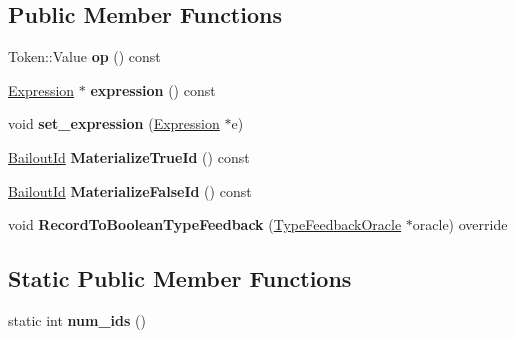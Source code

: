 \subsection*{Public Member Functions}
\begin{DoxyCompactItemize}
\item 
Token\+::\+Value {\bfseries op} () const \hypertarget{classv8_1_1internal_1_1_unary_operation_aa7ba61d263e7c3c37909031230894c5e}{}\label{classv8_1_1internal_1_1_unary_operation_aa7ba61d263e7c3c37909031230894c5e}

\item 
\hyperlink{classv8_1_1internal_1_1_expression}{Expression} $\ast$ {\bfseries expression} () const \hypertarget{classv8_1_1internal_1_1_unary_operation_a1c4b19c5a33bddaaa5cdaef84b027350}{}\label{classv8_1_1internal_1_1_unary_operation_a1c4b19c5a33bddaaa5cdaef84b027350}

\item 
void {\bfseries set\+\_\+expression} (\hyperlink{classv8_1_1internal_1_1_expression}{Expression} $\ast$e)\hypertarget{classv8_1_1internal_1_1_unary_operation_a7ce81074ce9790e356e4253abe3890af}{}\label{classv8_1_1internal_1_1_unary_operation_a7ce81074ce9790e356e4253abe3890af}

\item 
\hyperlink{classv8_1_1internal_1_1_bailout_id}{Bailout\+Id} {\bfseries Materialize\+True\+Id} () const \hypertarget{classv8_1_1internal_1_1_unary_operation_a056b0bdffff27333b08d29351ed4cd54}{}\label{classv8_1_1internal_1_1_unary_operation_a056b0bdffff27333b08d29351ed4cd54}

\item 
\hyperlink{classv8_1_1internal_1_1_bailout_id}{Bailout\+Id} {\bfseries Materialize\+False\+Id} () const \hypertarget{classv8_1_1internal_1_1_unary_operation_ae557f28b5bf97b18ed73f92fe9343db1}{}\label{classv8_1_1internal_1_1_unary_operation_ae557f28b5bf97b18ed73f92fe9343db1}

\item 
void {\bfseries Record\+To\+Boolean\+Type\+Feedback} (\hyperlink{classv8_1_1internal_1_1_type_feedback_oracle}{Type\+Feedback\+Oracle} $\ast$oracle) override\hypertarget{classv8_1_1internal_1_1_unary_operation_aaef1f9493dc092edb7a18cf90c01de54}{}\label{classv8_1_1internal_1_1_unary_operation_aaef1f9493dc092edb7a18cf90c01de54}

\end{DoxyCompactItemize}
\subsection*{Static Public Member Functions}
\begin{DoxyCompactItemize}
\item 
static int {\bfseries num\+\_\+ids} ()\hypertarget{classv8_1_1internal_1_1_unary_operation_abbaf08e7c9ee0f748aa62218cdb2bdf7}{}\label{classv8_1_1internal_1_1_unary_operation_abbaf08e7c9ee0f748aa62218cdb2bdf7}

\end{DoxyCompactItemize}
